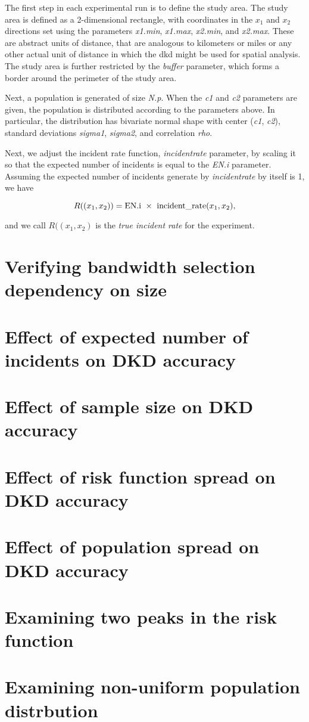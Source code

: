 The first step in each experimental run is to define the study area. 
The study area is defined as a 2-dimensional rectangle, with coordinates in the \(x_1\) and \(x_2\) directions set using the parameters \textit{x1.min}, \textit{x1.max}, \textit{x2.min}, and \textit{x2.max}.
These are abstract units of distance, that are analogous to kilometers or miles or any other actual unit of distance in which the \gls{dkd} might be used for spatial analysis.
The study area is further restricted by the \textit{buffer} parameter, which forms a border around the perimeter of the study area.

Next, a population is generated of size \textit{N.p}.
When the \textit{c1} and \textit{c2} parameters are given, the population is distributed according to the parameters above.
In particular, the distribution has bivariate normal shape with center (\textit{c1}, \textit{c2}),
standard deviations \textit{sigma1}, \textit{sigma2}, and correlation \textit{rho}.

Next, we adjust the incident rate function, \textit{incident\textunderscore rate} parameter, by scaling it so that the expected number of incidents is equal to the \textit{EN.i} parameter.
Assuming the expected number of incidents generate by \textit{incident\textunderscore rate} by itself is 1, we have

\[
    R((x_1, x_2)) = \mbox{EN.i}~\times~\mbox{incident\textunderscore rate}(x_1, x_2) \text{,}
\]

and we call \(R((x_1, x_2)\) is the \textit{true incident rate} for the experiment.

\section{Verifying bandwidth selection dependency on size}

\section{Effect of expected number of incidents on DKD accuracy}

\section{Effect of sample size on DKD accuracy}

\section{Effect of risk function spread on DKD accuracy}

\section{Effect of population spread on DKD accuracy}

\section{Examining two peaks in the risk function}

\section{Examining non-uniform population distrbution}

